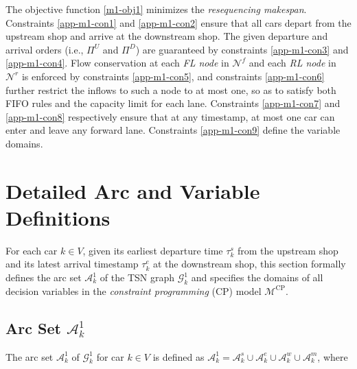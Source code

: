 \documentclass[12pt]{article}
\begin{document}
The objective function \eqref{m1-obj1} minimizes the \textit{resequencing makespan}. Constraints \eqref{app-m1-con1} and \eqref{app-m1-con2} ensure that all cars depart from the upstream shop and arrive at the downstream shop. The given departure and arrival orders (i.e., $\Pi^U$ and $\Pi^D$) are guaranteed by constraints \eqref{app-m1-con3} and \eqref{app-m1-con4}. Flow conservation at each \textit{FL node} in $\mathcal{N}^f$ and each \textit{RL node} in $\mathcal{N}^r$ is enforced by constraints \eqref{app-m1-con5}, and constraints \eqref{app-m1-con6} further restrict the inflows to such a node to at most one, so as to satisfy both FIFO rules and the capacity limit for each lane. Constraints \eqref{app-m1-con7} and \eqref{app-m1-con8} respectively ensure that at any timestamp, at most one car can enter and leave any forward lane. Constraints \eqref{app-m1-con9} define the variable domains.




\section{Detailed Arc and Variable Definitions}\label{app-sec4}
For each car $k\in V$, given its earliest departure time $\tau^s_k$ from the upstream shop and its latest arrival timestamp $\tau^e_k$ at the downstream shop, this section formally defines the arc set $\mathcal{A}^1_k$ of the TSN graph $\mathcal{G}^1_k$ and specifies the domains of all decision variables in the \textit{constraint programming} (CP) model $\mathcal{M}^{\text{CP}}$.

\subsection{Arc Set $\mathcal{A}^1_k$}
The arc set $\mathcal{A}^1_k$ of $\mathcal{G}^1_k$ for car $k\in V$ is defined as $\mathcal{A}^1_k=\mathcal{A}^s_k\cup \mathcal{A}^e_k\cup \mathcal{A}^w_k\cup \mathcal{A}^m_k$, where
\end{document}
